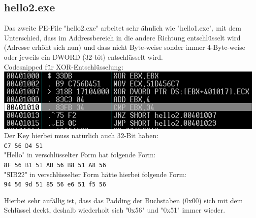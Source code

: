 \documentclass{article}
\begin{document}
	\subsection{hello2.exe}
	Das zweite PE-File "hello2.exe" arbeitet sehr ähnlich wie "hello1.exe", mit dem Unterschied, dass im Addressbereich in die andere Richtung entschlüsselt wird (Adresse erhöht sich nun) und dass nicht Byte-weise sonder immer 4-Byte-weise oder jeweils ein DWORD (32-bit) entschlüsselt wird.\\
	Codesnipped für XOR-Entschlüsselung:\\
	\includegraphics[width=0.5\linewidth]{pictures/hello2-important-code-snipped}\\
	Der Key hierbei muss natürlich auch 32-Bit haben:\\
	\texttt{C7 56 D4 51}\\
	"Hello" in verschlüsselter Form hat folgende Form:\\
	\texttt{8F 56 B1 51 AB 56 B8 51 A8 56}\\
	"SIB22" in verschlüsselter Form hätte hierbei folgende Form:\\
	\texttt{94 56 9d 51 85 56 e6 51 f5 56}\\
	
	\begin{mynote}
		Hierbei sehr aufällig ist, dass das Padding der Buchstaben (0x00) sich mit dem Schlüssel deckt, deshalb wiederholt sich "0x56" und "0x51" immer wieder.
	\end{mynote}
	
	\pagebreak
	
\end{document}
